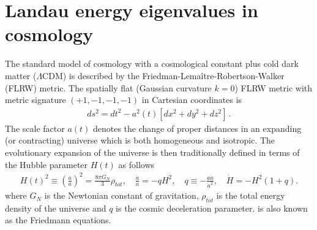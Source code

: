 \section{Landau energy eigenvalues in cosmology}
\label{sec:expansion}
\noindent The standard model of cosmology with a cosmological constant plus cold dark matter ($\Lambda\mathrm{CDM}$) is described by the Friedman-Lemaître-Robertson-Walker (FLRW) metric. The spatially flat (Gaussian curvature $k=0$) FLRW metric with metric signature $(+1,-1,-1,-1)$ in Cartesian coordinates is
\begin{align}
    \label{FLRW} ds^2=dt^2-a^2(t)\left[dx^2+dy^2+dz^2\right]\,.
\end{align}
The scale factor $a(t)$ denotes the change of proper distances in an expanding (or contracting) universe which is both homogeneous and isotropic. The evolutionary expansion of the universe is then traditionally defined in terms of the Hubble parameter $H(t)$ as follows
\begin{align}
  \label{Friedmann} H(t)^{2}\equiv\left(\frac{\dot a}{a}\right)^2=\frac{8\pi G_{N}}{3}\rho_{tot},\quad \frac{\ddot a}{a}=-qH^2,\quad 
q\equiv -\frac{a\ddot a}{\dot a^2},\quad \dot H=-H^2(1+q).
\end{align}
where $G_N$ is the Newtonian constant of gravitation, $\rho_{tot}$ is the total energy density of the universe and $q$ is the cosmic deceleration parameter.  is also known as the Friedmann equations. 

